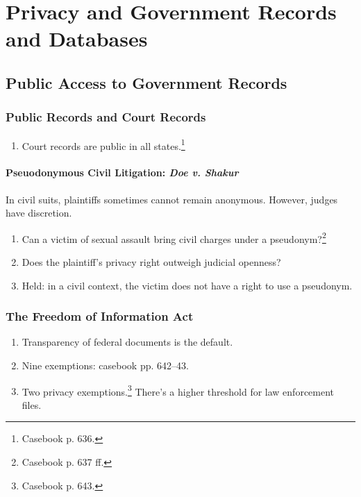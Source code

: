\section{Privacy and Government Records and Databases}

\subsection{Public Access to Government Records}

\subsubsection{Public Records and Court Records}

\begin{enumerate}
    \item Court records are public in all states.\footnote{Casebook p. 636.}
\end{enumerate}

\paragraph{Pseuodonymous Civil Litigation: \emph{Doe v. Shakur}}

In civil suits, plaintiffs sometimes cannot remain anonymous. However, judges 
have discretion.

\begin{enumerate}
    \item Can a victim of sexual assault bring civil charges under a 
    pseudonym?\footnote{Casebook p. 637 ff.}
    \item Does the plaintiff's privacy right outweigh judicial openness?
    \item Held: in a civil context, the victim does not have a right to use a 
    pseudonym.
\end{enumerate}

\subsubsection{The Freedom of Information Act}

\begin{enumerate}
    \item Transparency of federal documents is the default.
    \item Nine exemptions: casebook pp. 642--43.
    \item Two privacy exemptions.\footnote{Casebook p. 643.} There's a higher 
    threshold for law enforcement files.
\end{enumerate}


